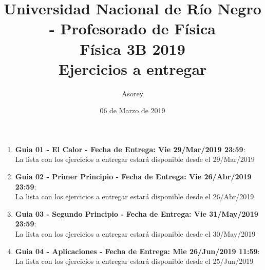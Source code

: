 \documentclass[a4paper,12pt]{article}
\begin{document}
\title{
{\normalsize{Universidad Nacional de Río Negro - Profesorado de Física}}\\
Física 3B 2019\\ Ejercicios a entregar}
\author{Asorey}
\date{06 de Marzo de 2019}
\maketitle

\begin{enumerate}
	\item {\bf{Guia 01 - El Calor - Fecha de Entrega: Vie 29/Mar/2019 23:59}}:\\
		La lista con los ejercicios a entregar estará disponible desde el 29/Mar/2019
	\item {\bf{Guia 02 - Primer Principio - Fecha de Entrega: Vie 26/Abr/2019 23:59}}:\\		
		La lista con los ejercicios a entregar estará disponible desde el 26/Abr/2019
	\item {\bf{Guia 03 - Segundo Principio - Fecha de Entrega: Vie 31/May/2019 23:59}}:\\		
		La lista con los ejercicios a entregar estará disponible desde el 30/May/2019
	\item {\bf{Guia 04 - Aplicaciones - Fecha de Entrega: Mie 26/Jun/2019 11:59}}:\\		
		La lista con los ejercicios a entregar estará disponible desde el 25/Jun/2019
\end{enumerate}
\end{document}
